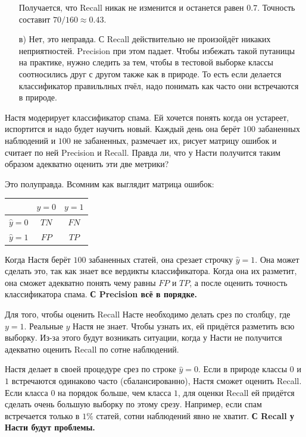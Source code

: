 \documentclass[12pt, a4paper, oneside]{article}
\theoremstyle{plain} %
\theoremstyle{definition}
\newcounter{problem}%
\renewcommand{\theproblem}{\arabic{problem}}
\newenvironment{problem}{
\addtocounter{problem}{1}\noindent{ \color{titleblue} \large \bfseries Упражнение~\theproblem \vspace{1ex} \newline}
}{ }
\newcommand{\indef}[1]{\textbf{ \color{green} #1}}
\begin{document}
\begin{solution}
\begin{enumerate}
Получается, что Recall никак не изменится и останется равен $0.7$. Точность составит $70/160 \approx 0.43$.

\item[в)] Нет, это неправда. С Recall действительно не произойдёт никаких неприятностей. Precision при этом падает. Чтобы избежать такой путаницы на практике, нужно следить за тем, чтобы в тестовой выборке классы соотносились друг с другом также как в природе. То есть если делается классификатор правильлных пчёл, надо понимать как часто они встречаются в природе. 
\end{enumerate} 
\end{solution}

\begin{problem} 
Настя модерирует классификатор спама. Ей хочется понять когда он устареет, испортится и надо будет научить новый. Каждый день она берёт $100$ забаненных наблюдений и $100$ не забаненных, размечает их, рисует матрицу ошибок и считает по ней Precision и Recall. Правда ли, что у Насти получится таким образом адекватно оценить эти две метрики? 
\end{problem} 

\begin{solution}
Это полуправда. Всомним как выглядит матрица ошибок: 

\begin{center}
	\begin{tabular}{|c|c|c|}
		\hline
		& $y=0$  &  $ y = 1$ \\  \hline 
		$\hat y = 0$ & $TN$ & $FN$ \\ \hline 
		$\hat y = 1$ & $FP$ & $TP$ \\ \hline
	\end{tabular}
\end{center}

Когда Настя берёт $100$ забаненных статей, она срезает строчку $\hat y = 1$. Она может сделать это, так как знает все вердикты классификатора. Когда она их разметит, она сможет адекватно понять чему равны $FP$ и $TP$, а после оценить точность классификатора спама. \indef{С Precision всё в порядке.} 

Для того, чтобы оценить Recall Насте необходимо делать срез по столбцу, где $y=1$. Реальные $y$ Настя не знает. Чтобы узнать их, ей придётся разметить всю выборку. Из-за этого будут возникать ситуации, когда у Насти не получится адекватно оценить Recall по сотне наблюдений. 

Настя делает в своей процедуре срез по строке $\hat y = 0$. Если в природе классы $0$ и $1$ встречаются одинаково часто (сбалансированно), Настя сможет оценить Recall. Если класса $0$ на порядок больше, чем класса $1$, для оценки Recall ей придётся сделать очень большую выборку по этому срезу. Например, если спам встречается только в $1\%$ статей, сотни наблюдений явно не хватит. \indef{С Recall у Насти будут проблемы.}  
\end{solution}



\end{document}
